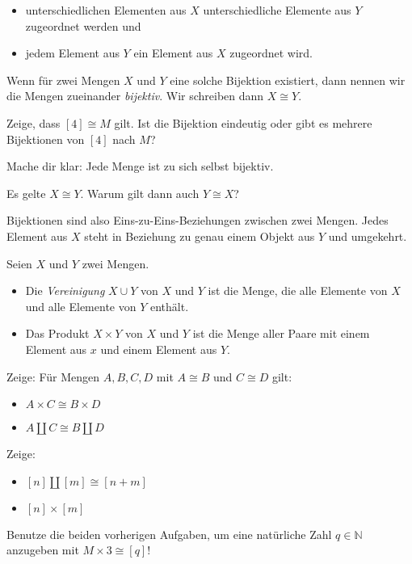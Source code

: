 \documentclass{uebungszettel}
\newcommand{\N}{\mathbb{N}} %
\begin{document}
\begin{itemize}
  \item unterschiedlichen Elementen aus $X$ unterschiedliche Elemente aus $Y$ zugeordnet werden und
  \item jedem Element aus $Y$ ein Element aus $X$ zugeordnet wird.
\end{itemize}

Wenn für zwei Mengen $X$ und $Y$ eine solche Bijektion existiert, dann nennen wir die Mengen zueinander \emph{bijektiv}. Wir schreiben dann $X \cong Y$.

\begin{aufgabe}{}
  Zeige, dass $[4] \cong M$ gilt. Ist die Bijektion eindeutig oder gibt es mehrere Bijektionen von $[4]$ nach $M$?
\end{aufgabe}

\begin{aufgabe}{}
  Mache dir klar: Jede Menge ist zu sich selbst bijektiv.
\end{aufgabe}

\begin{aufgabe}{}
  Es gelte $X \cong Y$. Warum gilt dann auch $Y \cong X$?
\end{aufgabe}

Bijektionen sind also Eins-zu-Eins-Beziehungen zwischen zwei Mengen. Jedes Element aus $X$ steht in Beziehung zu genau einem Objekt aus $Y$ und umgekehrt.

Seien $X$ und $Y$ zwei Mengen.

\begin{itemize}
  \item Die \emph{Vereinigung} $X \cup Y$ von $X$ und $Y$ ist die Menge, die alle Elemente von $X$ und alle Elemente von $Y$ enthält.
  \item Das Produkt $X \times Y$ von $X$ und $Y$ ist die Menge aller Paare mit einem Element aus $x$ und einem Element aus $Y$.
\end{itemize}

\begin{aufgabe}{}
  Zeige: Für Mengen $A, B, C, D$ mit $A \cong B$ und $C \cong D$ gilt:
  \begin{itemize}
    \item $A \times C \cong B \times D$
    \item $A \coprod C \cong B \coprod D$
  \end{itemize}
\end{aufgabe}

\begin{aufgabe}{}
  Zeige:
  \begin{itemize}
    \item $[n] \coprod [m] \cong [n+m]$
    \item $[n] \times [m]$
  \end{itemize}
\end{aufgabe}

\begin{aufgabe}{}
  Benutze die beiden vorherigen Aufgaben, um eine natürliche Zahl $q \in \N$ anzugeben mit $M \times 3 \cong [q]$!
\end{aufgabe}
\end{document}
